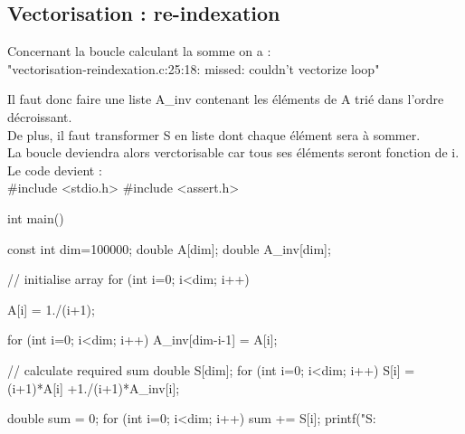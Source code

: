 \documentclass{article}
\begin{document}
\subsection{Vectorisation : re-indexation}

Concernant la boucle calculant la somme on a :\\
"vectorisation-reindexation.c:25:18: missed: couldn't vectorize loop"\\

\vspace{0.5cm}

Il faut donc faire une liste A_inv contenant les éléments de A trié dans l'ordre décroissant.\\
De plus, il faut transformer S en liste dont chaque élément sera à sommer.\\
La boucle deviendra alors verctorisable car tous ses éléments seront fonction de i.\\

Le code devient : \\

#include <stdio.h>
#include <assert.h>

int main() {	  

  const int dim=100000;
  double A[dim];
  double A_inv[dim];

  // initialise array
  for (int i=0; i<dim; i++) {
    A[i] = 1./(i+1);
    
  }
  for (int i=0; i<dim; i++) {
    A_inv[dim-i-1] = A[i];
  }

  // calculate required sum
  double S[dim];
  for (int i=0; i<dim; i++)
    S[i] = (i+1)*A[i] +1./(i+1)*A_inv[i]; 
  
  double sum = 0;
  for (int i=0; i<dim; i++)
    sum += S[i];
  printf("S: %
}
\end{document}
